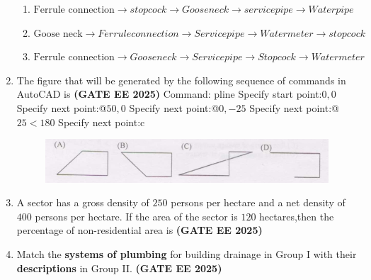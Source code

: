 \documentclass[journal,12pt,onecolumn]{IEEEtran}
\theoremstyle{remark}
\begin{document}
\begin{enumerate}
\begin{enumerate}
     \item $\text{Ferrule connection}\longrightarrow{stop cock}\longrightarrow{Goose neck}\longrightarrow{service pipe}\longrightarrow{Water pipe}$
     \item $\text{Goose neck}\longrightarrow{Ferrule connection}\longrightarrow{Service pipe}\longrightarrow{Water meter}\longrightarrow{stop cock}$
     \item $\text{Ferrule connection}\longrightarrow{Goose neck}\longrightarrow{Service pipe}\longrightarrow{Stop cock}\longrightarrow{Water meter}$
 \newline
 \end{enumerate}  
\item The figure that will be generated by the following sequence of commands in AutoCAD is \hfill \textbf{(GATE EE 2025)}
\newline
Command: pline
\newline
Specify start point:$0,0$
\newline
Specify next point:@$50,0$
\newline
Specify next point:@$0,-25$
\newline
Specify next point:@$25<180$
\newline
Specify next point:c
\newline
\begin{figure}[H]
    \centering
    \includegraphics[width=1\linewidth]{figs/fig1.png}
    \caption{}
    \label{fig1}
\end{figure}
 \item  A sector has a gross density of $250$ persons per hectare and a net density of $400$ persons per hectare. If the area of the sector is $120$ hectares,then the percentage of non-residential area is \hfill \textbf{(GATE EE 2025)}
 \begin{enumerate}
 \end{enumerate}
 \item Match the \textbf{systems of plumbing} for building drainage in Group I with their \textbf{descriptions} in Group II. \hfill \textbf{(GATE EE 2025)}

\end{enumerate}
\end{document}
